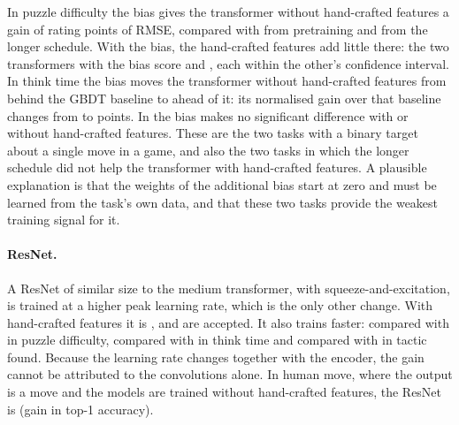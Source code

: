 \documentclass[11pt]{article}
\begin{document}
In puzzle difficulty the bias gives the transformer without hand-crafted
features a gain of
rating points of RMSE, compared with
from pretraining and
from the longer schedule. With the bias, the hand-crafted features add little
there: the two transformers with the bias score
 and
, each within the
other's confidence interval. In think time the bias moves the transformer
without hand-crafted features from behind the GBDT baseline to ahead of it:
its normalised gain over that baseline changes from
 to
 points. In
 the bias makes
no significant difference with or without hand-crafted features. These are
the two tasks with a binary target about a single move in a game, and also
the two tasks in which the longer schedule did not help the transformer with
hand-crafted features. A plausible explanation is that the weights of the
additional bias start at zero and must be learned from the task's own data,
and that these two tasks provide the weakest training signal for it.

\paragraph{ResNet.}
A ResNet of similar size to the medium transformer, with
squeeze-and-excitation, is trained at a higher peak learning rate, which is
the only other change. With hand-crafted features it is
, and
 are accepted. It also trains faster:
 compared with
 in puzzle
difficulty,  compared with
 in think time and
 compared with
 in tactic found.
Because the learning rate changes together with the encoder, the gain cannot
be attributed to the convolutions alone. In human move, where the output is
a move and the models are trained without hand-crafted features, the ResNet
is  (gain
 in top-1 accuracy).
\end{document}
